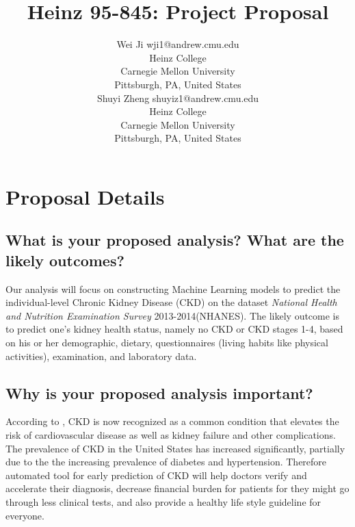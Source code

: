 \documentclass[twoside,11pt]{article}
\begin{document}
\title{Heinz 95-845: Project Proposal}

\author{\name Wei Ji \email wji1@andrew.cmu.edu \\
       \addr Heinz College\\
       Carnegie Mellon University\\
       Pittsburgh, PA, United States \\
       \AND
       \name Shuyi Zheng \email shuyiz1@andrew.cmu.edu \\
       \addr Heinz College\\
       Carnegie Mellon University\\
       Pittsburgh, PA, United States}
\maketitle

\section{Proposal Details}


\subsection{What is your proposed analysis? What are the likely outcomes?}
Our analysis will focus on constructing Machine Learning models to predict the individual-level Chronic Kidney Disease (CKD) on the dataset \textit{National Health and Nutrition Examination Survey} 2013-2014(NHANES). The likely outcome is to predict one's kidney health status, namely no CKD or CKD stages 1-4, based on his or her demographic, dietary, questionnaires (living habits like physical activities), examination, and laboratory data. 


\subsection{Why is your proposed analysis important?}
According to \cite{Coresh}, CKD is now recognized as a common condition that elevates the risk of cardiovascular disease as well as kidney failure and other complications. The prevalence of CKD in the United States has increased significantly, partially due to the the increasing prevalence of diabetes and hypertension. Therefore automated tool for early prediction of CKD will help doctors verify and accelerate their diagnosis, decrease financial burden for patients for they might go through less clinical tests, and also provide a healthy life style guideline for everyone. 
\end{document}
